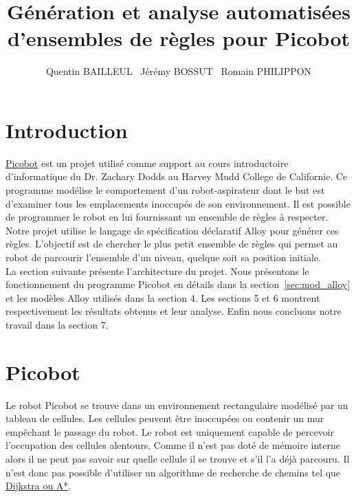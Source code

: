 \documentclass{article}
\begin{document}
\title{Génération et analyse automatisées d’ensembles de règles pour Picobot}

\author{Quentin BAILLEUL \  Jérémy BOSSUT \  Romain PHILIPPON}


\maketitle
\newpage
\tableofcontents

\newpage


\section{Introduction}
\href{https://learn.cs.uml.edu/ext/picobot/}{Picobot} est un projet utilisé comme support au cours introductoire d'informatique du Dr. Zachary Dodds au Harvey Mudd College de Californie. Ce programme modélise le comportement d’un robot-aspirateur dont le but est d’examiner tous les emplacements inoccupés de son environnement. Il est possible de programmer le robot en lui fournissant un ensemble de règles à respecter.
\\

Notre projet utilise le langage de spécification déclaratif Alloy pour générer ces règles. L'objectif est de chercher le plus petit ensemble de règles qui permet au robot de parcourir l’ensemble d’un niveau, quelque soit sa position initiale.
\\

La section suivante présente l’architecture du projet. Nous présentons le fonctionnement du programme Picobot en détails dans la section~\ref{sec:mod_alloy} et les modèles Alloy utilisés dans la section 4. Les sections 5 et 6 montrent respectivement les résultats obtenus et leur analyse. Enfin nous concluons notre travail dans la section 7.


\section{Picobot}
Le robot Picobot se trouve dans un environnement rectangulaire modélisé par un tableau de cellules. Les cellules peuvent être inoccupées ou contenir un mur empêchant le passage du robot. Le robot est uniquement capable de percevoir l’occupation des cellules alentours. Comme il n’est pas doté de mémoire interne alors il ne peut pas savoir sur quelle cellule il se trouve et s’il l’a déjà parcouru. Il n’est donc pas possible d’utiliser un algorithme de recherche de chemins tel que \href{http://fr.wikipedia.org/wiki/Recherche_de_chemin}{Dijkstra ou A*}.
\end{document}
